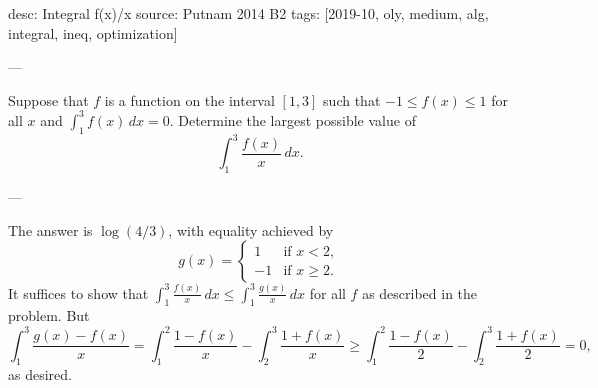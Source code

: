 desc: Integral f(x)/x
source: Putnam 2014 B2
tags: [2019-10, oly, medium, alg, integral, ineq, optimization]

---

Suppose that $f$ is a function on the interval $[1,3]$ such that $-1\le f(x)\le1$ for all $x$ and $\int_1^3f(x)\,dx=0$. Determine the largest possible value of \[\int_1^3\frac{f(x)}x\,dx.\]

---

The answer is $\log(4/3)$, with equality achieved by \[g(x)=\begin{cases}
        1&\text{if }x<2,\\
        -1&\text{if }x\ge2.
\end{cases}\]
It suffices to show that $\int_1^3\frac{f(x)}x\,dx\le\int_1^3\frac{g(x)}x\,dx$ for all $f$ as described in the problem. But \[\int_1^3\frac{g(x)-f(x)}x=\int_1^2\frac{1-f(x)}x-\int_2^3\frac{1+f(x)}x\ge\int_1^2\frac{1-f(x)}2-\int_2^3\frac{1+f(x)}2=0,\]
as desired.
